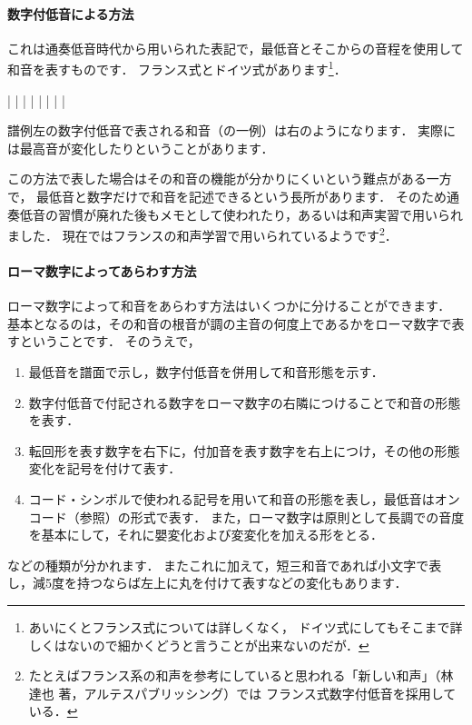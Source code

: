 \documentclass[dvipdfmx,uplatex,b5paper,openany,jbase=12Q,nomag*,textwidth-limit=44%
               ]{gachimuchi}[2020/05/05]
\begin{document}
\paragraph{数字付低音による方法}
これは通奏低音時代から用いられた表記で，最低音とそこからの音程を使用して和音を表すものです．
フランス式とドイツ式があります\footnote{あいにくとフランス式については詳しくなく，
ドイツ式にしてもそこまで詳しくはないので細かくどうと言うことが出来ないのだが．
}．
\begin{Music}
  \Startpiece%
  \Notes%
  \figbassu[6]%
  \figbassu[4][6]%
  \figbassu[7]%
  \figbassu[5][6]%
  \figbassu[3][4][6]%
  \figbassu[2]%
  |%
  \en\doublebar%
  \Notes%
  |\prevstaff%
  \en\Notes
  \figbassu[6]|%
  \en\Notes
  \figbassu[4][6]|%
  \en\Notes
  \figbassu[7]|%
  \en\Notes
  \figbassu[5][6]|%
  \en\Notes
  \figbassu[3][4][6]|%
  \en\Notes
  \figbassu[2]|%
  \en\setdoublebar%
  \endpiece%
\end{Music}

譜例左の数字付低音で表される和音（の一例）は右のようになります．
実際には最高音が変化したりということがあります．

この方法で表した場合はその和音の機能が分かりにくいという難点がある一方で，
最低音と数字だけで和音を記述できるという長所があります．
そのため通奏低音の習慣が廃れた後もメモとして使われたり，あるいは和声実習で用いられました．
現在ではフランスの和声学習で用いられているようです\footnote{%
たとえばフランス系の和声を参考にしていると思われる「新しい和声」（林 達也 著，アルテスパブリッシング）では
フランス式数字付低音を採用している．}．

\paragraph{ローマ数字によってあらわす方法}
ローマ数字によって和音をあらわす方法はいくつかに分けることができます．
基本となるのは，その和音の根音が調の主音の何度上であるかをローマ数字で表すということです．
そのうえで，
\begin{enumerate}
  \item 最低音を譜面で示し，数字付低音を併用して和音形態を示す．
  \item 数字付低音で付記される数字をローマ数字の右隣につけることで和音の形態を表す．
  \item 転回形を表す数字を右下に，付加音を表す数字を右上につけ，その他の形態変化を記号を付けて表す．
  \item コード・シンボルで使われる記号を用いて和音の形態を表し，最低音はオンコード（参照）の形式で表す．
        また，ローマ数字は原則として長調での音度を基本にして，それに嬰変化および変変化を加える形をとる．
\end{enumerate}
などの種類が分かれます．
またこれに加えて，短三和音であれば小文字で表し，減5度を持つならば左上に丸を付けて表すなどの変化もあります．
\end{document}
